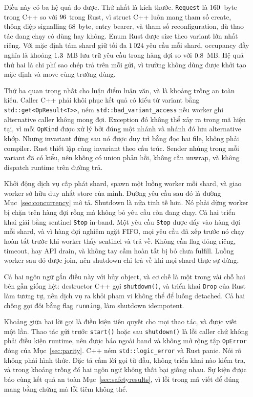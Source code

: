 Điều này có ba hệ quả đo được. Thứ nhất là kích thước. \texttt{Request} là $160$~byte
trong C++ so với $96$ trong Rust, vì struct C++ luôn mang tham số create, thông điệp signalling
$68$ byte, entry bearer, và tham số reconfiguration, dù
thao tác đang chạy có dùng hay không. Enum Rust được size theo variant lớn nhất
riêng. Với mặc định tám shard giữ tối đa $1\,024$ yêu cầu mỗi shard, occupancy đầy nghĩa là khoảng $1.3$~MB
lưu trữ yêu cầu trong hàng đợi so với $0.8$~MB. Hệ quả thứ hai là chi phí sao chép
trả trên mỗi gửi, vì trường không dùng được khởi tạo mặc định và move cùng
trường dùng.

Thứ ba quan trọng nhất cho luận điểm luận văn, và là khoảng trống an toàn kiểu.
Caller C++ phải khôi phục kết quả có kiểu từ variant bằng
\texttt{std::get<OpResult<T>>}, ném \texttt{std::bad\_variant\_access} nếu worker
ghi alternative caller không mong đợi. Exception đó không thể xảy ra trong
mã hiện tại, vì mỗi \texttt{OpKind} được xử lý bởi đúng một nhánh và nhánh đó
lưu alternative khớp. Nhưng invariant đứng sau nó được duy trì bằng đọc hai
file, không phải compiler. Rust thiết lập cùng invariant theo cấu trúc. Sender nhúng
trong mỗi variant đã có kiểu, nên không có union phản hồi, không cần unwrap, và không
dispatch runtime trên đường trả.

Khởi động dịch vụ cấp phát shard, spawn một luồng worker mỗi shard, và giao
worker sở hữu duy nhất store của mình. Đường yêu cầu sau đó là đường Mục~\ref{sec:concurrency} mô tả. Shutdown là nửa tinh tế hơn. Nó phải dừng
worker bị chặn trên hàng đợi rỗng mà không bỏ yêu cầu còn
đang chạy. Cả hai triển khai giải bằng sentinel \texttt{Stop} in-band.
Một yêu cầu \texttt{Stop} được đẩy vào hàng đợi mỗi shard, và vì hàng đợi nghiêm ngặt
FIFO, mọi yêu cầu đã xếp trước nó chạy hoàn tất trước khi worker
thấy sentinel và trả về. Không cần flag đóng riêng, timeout, hay API drain,
và không tay cầm hoàn tất bị bỏ chưa fulfill. Luồng worker sau đó được join, nên shutdown
chỉ trả về khi mọi shard thực sự dừng.

Cả hai ngôn ngữ gắn điều này với hủy object, và cơ chế là một trong vài chỗ
hai bên gần giống hệt: destructor C++ gọi \texttt{shutdown()}, và
triển khai \texttt{Drop} của Rust làm tương tự, nên dịch vụ ra khỏi phạm vi không thể để
luồng detached. Cả hai chống gọi đôi bằng flag \texttt{running},
làm shutdown idempotent.

Khoảng giữa hai lời gọi là điều kiện tiên quyết cho mọi thao tác, và được viết
một lần. Thao tác gửi trước \texttt{start()} hoặc sau \texttt{shutdown()} là lỗi caller
chứ không phải điều kiện runtime, nên được báo ngoài band và không mở rộng tập
\texttt{OpError} đóng của Mục~\ref{sec:parity}. C++ ném \texttt{std::logic\_error} và Rust
panic. Nói rõ không phải hình thức. Đặc tả cấm lời gọi từ
đầu, không triển khai nào kiểm tra, và trong khoảng trống đó hai ngôn ngữ không thất bại giống nhau.
Sự kiện được báo cùng kết quả an toàn Mục~\ref{sec:safetyresults}, vì
lỗi trong mã viết để đúng mang bằng chứng mà lỗi tiêm không thể.


